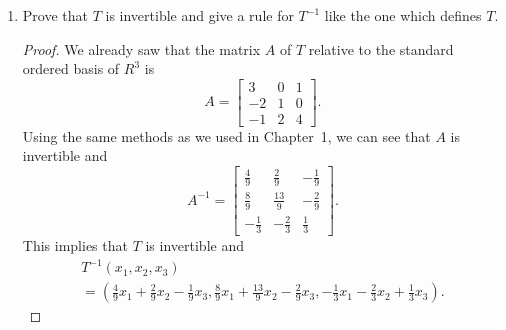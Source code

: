 \begin{enumerate}
\item Prove that $T$ is invertible and give a rule for $T^{-1}$ like
  the one which defines $T$.
  \begin{proof}
    We already saw that the matrix $A$ of $T$ relative to the standard
    ordered basis of $R^3$ is
    \begin{equation*}
      A =
      \begin{bmatrix}
        3 & 0 & 1 \\
        -2 & 1 & 0 \\
        -1 & 2 & 4
      \end{bmatrix}.
    \end{equation*}
    Using the same methods as we used in Chapter~1, we can see that
    $A$ is invertible and
    \begin{equation*}
      A^{-1} =
      \begin{bmatrix}
        \frac49 & \frac29 & -\frac19 \\[3pt]
        \frac89 & \frac{13}9 & -\frac29 \\[3pt]
        -\frac13 & -\frac23 & \frac13
      \end{bmatrix}.
    \end{equation*}
    This implies that $T$ is invertible and
    \begin{multline*}
      T^{-1}(x_1,x_2,x_3) \\
      = \left(
        \frac49x_1 + \frac29x_2 - \frac19x_3,
        \frac89x_1 + \frac{13}9x_2 - \frac29x_3,
        -\frac13x_1 - \frac23x_2 + \frac13x_3
      \right).
    \end{multline*}
  \end{proof}
\end{enumerate}
